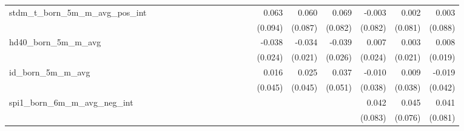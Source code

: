 \begin{tabular}{lrrrrrrrrrrrrrrrrrr}
stdm\_t\_born\_5m\_m\_avg\_pos\_int         &             &             &             &             &             &             &             &             &             &             &             &             &       0.063 &       0.060 &       0.069 &      -0.003 &       0.002 &       0.003 \\ 
                                            &             &             &             &             &             &             &             &             &             &             &             &             &     (0.094) &     (0.087) &     (0.082) &     (0.082) &     (0.081) &     (0.088) \\ 
hd40\_born\_5m\_m\_avg                      &             &             &             &             &             &             &             &             &             &             &             &             &      -0.038 &      -0.034 &      -0.039 &       0.007 &       0.003 &       0.008 \\ 
                                            &             &             &             &             &             &             &             &             &             &             &             &             &     (0.024) &     (0.021) &     (0.026) &     (0.024) &     (0.021) &     (0.019) \\ 
id\_born\_5m\_m\_avg                        &             &             &             &             &             &             &             &             &             &             &             &             &       0.016 &       0.025 &       0.037 &      -0.010 &       0.009 &      -0.019 \\ 
                                            &             &             &             &             &             &             &             &             &             &             &             &             &     (0.045) &     (0.045) &     (0.051) &     (0.038) &     (0.038) &     (0.042) \\ 
spi1\_born\_6m\_m\_avg\_neg\_int            &             &             &             &             &             &             &             &             &             &             &             &             &             &             &             &       0.042 &       0.045 &       0.041 \\ 
                                            &             &             &             &             &             &             &             &             &             &             &             &             &             &             &             &     (0.083) &     (0.076) &     (0.081) \\ 

\end{tabular}
